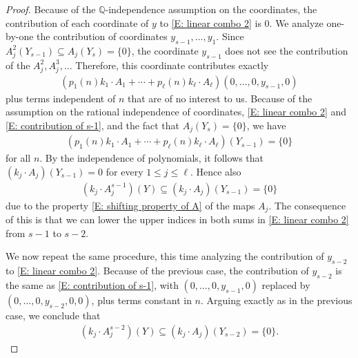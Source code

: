 \documentclass[11pt]{amsart}
\theoremstyle{definition}
\newcommand{\Q}{{\mathbb Q}}
\newcommand{\1}{{\mathbf{1}}}
\begin{document}
\begin{proof}
    Because of the $\Q$-independence assumption on the coordinates, the contribution of each coordinate of $y$ to \eqref{E: linear combo 2} is 0. We analyze one-by-one the contribution of coordinates $y_{s-1}, \ldots, y_1$. Since $A_j^2(Y_{s-1})\subseteq A_j(Y_s) = \{0\}$, the coordinate $y_{s-1}$ does not see the contribution of the $A_j^2, A_j^3,\ldots$
    Therefore, this coordinate contributes exactly
    \begin{align}\label{E: contribution of s-1}
        (p_1(n) k_{1}\cdot A_{1} + \cdots + p_\ell(n) k_{\ell}\cdot A_{\ell})(0,\ldots, 0, y_{s-1}, 0)
    \end{align}
    plus terms independent of $n$ that are of no interest to us. Because of the assumption on the rational independence of coordinates, \eqref{E: linear combo 2} and \eqref{E: contribution of s-1}, and the fact that $A_{j}(Y_{s})=\{0\}$, we have
    \begin{align*}
        (p_1(n) k_{1}\cdot A_{1} + \cdots + p_\ell(n) k_{\ell}\cdot A_{\ell})({Y_{s-1}}) = \{0\}
    \end{align*}
     for all $n$. By the independence of polynomials, it follows that $(k_j\cdot A_j)({Y_{s-1}}) = 0$ for every $1\leq j\leq \ell$. Hence also
    \begin{align*}
        (k_j\cdot A_j^{s-1})(Y) \subseteq (k_j\cdot A_j)(Y_{s-1}) = \{0\}
    \end{align*}
    due to the property \eqref{E: shifting property of A} of the maps $A_j$.
    The consequence of this is that we can lower the upper indices in both sums in \eqref{E: linear combo 2} from $s-1$ to $s-2$. 

    We now repeat the same procedure, this time analyzing the contribution of $y_{s-2}$ to \eqref{E: linear combo 2}. Because of the previous case, the contribution of $y_{s-2}$ is the same as \eqref{E: contribution of s-1}, with $(0, \ldots, 0, y_{s-1},0)$ replaced by $(0,\ldots, 0, y_{s-2},0,0)$, plus terms constant in $n$. Arguing exactly as in the previous case, we conclude that
        \begin{align*}
        (k_j\cdot A_j^{s-2})(Y) \subseteq (k_j\cdot A_j)(Y_{s-2}) = \{0\}.
    \end{align*}
    

\end{proof}
\end{document}
